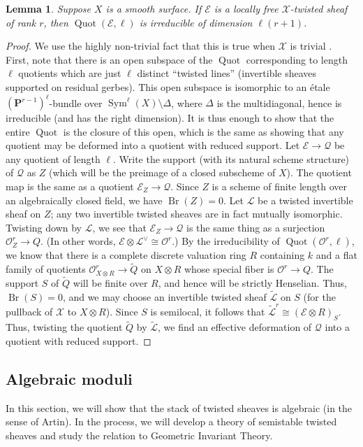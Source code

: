 \documentclass[11pt]{amsart}
\newcommand{\field}[1]{\mathbf #1}
\newcommand{\ms}[1]{\mathscr #1}
\renewcommand{\P}{\field P}
\DeclareMathOperator{\quot}{Quot}
\renewcommand{\[}{[\!\hspace{0.03em}[}
\renewcommand{\]}{]\!\hspace{0.03em}]}
\renewcommand{\(}{(\!\hspace{0.03em}(}
\renewcommand{\)}{)\!\hspace{0.03em})}
\DeclareMathOperator*{\tensor}{\otimes}
\DeclareMathOperator{\Br}{\operatorname{Br}}
\newtheorem{lem}{Lemma}[subsubsection]%
\theoremstyle{definition}
\theoremstyle{remark}
\begin{document}
\begin{lem}\label{L:irred quot} Suppose $X$ is a smooth surface.  
If $\ms E$ is a locally free $\ms X$-twisted sheaf of 
rank $r$, then $\quot(\ms E,\ell)$ is irreducible of dimension 
$\ell(r+1)$.
\end{lem}
\begin{proof} We use the highly non-trivial fact that this is true 
when $\ms X$ is trivial \cite[6.A.1]{h-l}.  First, note that there is an 
open subspace of the $\quot$ corresponding to length $\ell$ quotients 
which are just $\ell$ distinct ``twisted lines'' (invertible sheaves supported on residual gerbes).  This open subspace is 
isomorphic to an \'etale $(\P^{r-1})^{\ell}$-bundle over 
$\operatorname{Sym}^{\ell}(X)\setminus\Delta$, where $\Delta$ is the 
multidiagonal, hence is irreducible (and has the right dimension).  It is thus enough to show that 
the entire $\quot$ is the closure of this open, which is the same as 
showing that any quotient may be deformed into a quotient with reduced 
support.  Let $\ms E\to\ms Q$ be any quotient of length $\ell$.  Write 
the support (with its natural scheme structure) of $\ms Q$ as $Z$ (which will be the preimage of a closed 
subscheme of $X$).  The quotient map is the same as a quotient $\ms 
E_{Z}\to\ms Q$.  Since $Z$ is a scheme of finite length over an 
algebraically closed field, we have $\Br(Z)=0$.  Let $\ms L$ be a 
twisted invertible sheaf on $Z$; any two invertible twisted sheaves are 
in fact mutually isomorphic.  Twisting down by $\ms L$, we see 
that $\ms E_{Z}\to\ms Q$ is the same thing as a surjection ${\ms O}_{Z}^{r}\to 
Q$.  (In other words, $\ms E\tensor\ms L^{\vee}\cong{\ms O}^{r}$.)  By the irreducibility of $\quot({\ms O}^{r},\ell)$, we know that 
there is a complete discrete valuation ring $R$ containing $k$ and a 
flat family of quotients ${\ms O}^{r}_{X\tensor R}\to\widetilde Q$ on $X\tensor 
R$ whose special fiber is ${\ms O}^{r}\to Q$.  The support $S$ of 
$\widetilde Q$ will be finite over $R$, and hence will be strictly 
Henselian.  Thus, $\Br(S)=0$, and we may choose an invertible twisted 
sheaf $\widetilde{\ms L}$ on $S$ (for the pullback of $\ms X$ to 
$X\tensor R$).  Since $S$ is semilocal, it follows that $\widetilde{\ms 
L}^{r}\cong(\ms E\tensor 
R)_{S}$.  Thus, twisting the quotient $\widetilde Q$ by 
$\widetilde{\ms L}$, we find an effective deformation of $\ms Q$ into 
a quotient with reduced support.
\end{proof}


\subsection{Algebraic moduli}\label{S:moduli}
In this section, we will show that the stack of 
twisted sheaves is algebraic (in the sense of Artin).  In 
the process, we will develop a theory of semistable twisted sheaves 
and study the relation to Geometric Invariant Theory.
\end{document}
